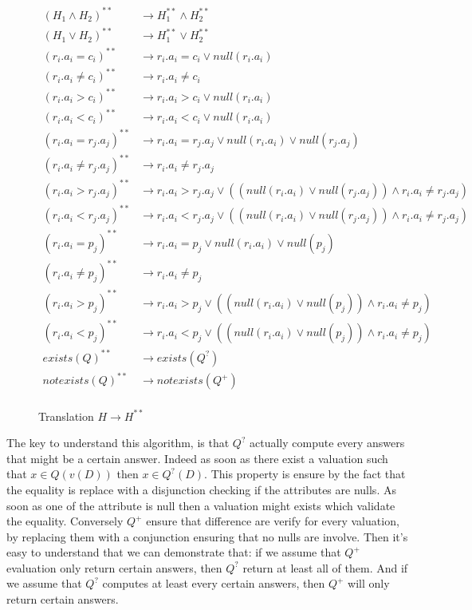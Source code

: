 \begin{figure}[H]
	\caption{\label{h**} Translation $H \rightarrow H^{**}$ }
		\begin{mdframed}
			\fontsize{8}{6}
\begin{align*}
	(H_1 \land H_2)^{**} & \rightarrow H_1^{**} \land H_2^{**} \\
	(H_1 \lor H_2)^{**} & \rightarrow H_1^{**} \lor H_2^{**} \\
	(r_i.a_i = c_i)^{**} & \rightarrow r_i.a_i = c_i \lor null(r_i.a_i)\\
	(r_i.a_i \neq c_i)^{**}& \rightarrow r_i.a_i \neq c_i \\
	(r_i.a_i > c_i)^{**} & \rightarrow r_i.a_i > c_i \lor null(r_i.a_i)\\
	(r_i.a_i < c_i)^{**} & \rightarrow r_i.a_i < c_i \lor null(r_i.a_i)\\
	(r_i.a_i = r_j.a_j)^{**} & \rightarrow r_i.a_i = r_j.a_j \lor null(r_i.a_i) \lor null(r_j.a_j)\\
	(r_i.a_i \neq r_j.a_j)^{**} & \rightarrow r_i.a_i \neq r_j.a_j \\
	(r_i.a_i > r_j.a_j)^{**} & \rightarrow r_i.a_i > r_j.a_j \lor \left( (null(r_i.a_i) \lor null(r_j.a_j)) \land r_i.a_i \neq r_j.a_j \right) \\
	(r_i.a_i < r_j.a_j)^{**} & \rightarrow r_i.a_i < r_j.a_j \lor \left( (null(r_i.a_i) \lor null(r_j.a_j)) \land r_i.a_i \neq r_j.a_j \right) \\
	(r_i.a_i = p_j)^{**} & \rightarrow r_i.a_i = p_j \lor null(r_i.a_i) \lor null(p_j)\\
	(r_i.a_i \neq p_j)^{**} & \rightarrow r_i.a_i \neq p_j \\
	(r_i.a_i > p_j)^{**} & \rightarrow r_i.a_i > p_j \lor \left( (null(r_i.a_i) \lor null(p_j)) \land r_i.a_i \neq p_j \right) \\
	(r_i.a_i < p_j)^{**} & \rightarrow r_i.a_i < p_j \lor \left( (null(r_i.a_i) \lor null(p_j)) \land r_i.a_i \neq p_j \right) \\
	exists(Q)^{**} & \rightarrow exists(Q^?) \\
	notexists(Q)^{**} & \rightarrow notexists(Q^+) \\
\end{align*}
	\end{mdframed}
\end{figure}

The key to understand this algorithm, is that $Q^?$ actually compute every answers that might be a certain answer. Indeed as soon as there exist a valuation such that $x \in Q(v(D))$ then $x \in Q^?(D)$. This property is ensure by the fact that the equality is replace with a disjunction checking if the attributes are nulls. As soon as one of the attribute is null then a valuation might exists which validate the equality. Conversely $Q^+$ ensure that difference are verify for every valuation, by replacing them with a conjunction ensuring that no nulls are involve. Then it's easy to understand that we can demonstrate that: if we assume that $Q^+$ evaluation only return certain answers, then $Q^?$ return at least all of them. And if we assume that $Q^?$ computes at least every certain answers, then $Q^+$ will only return certain answers.

